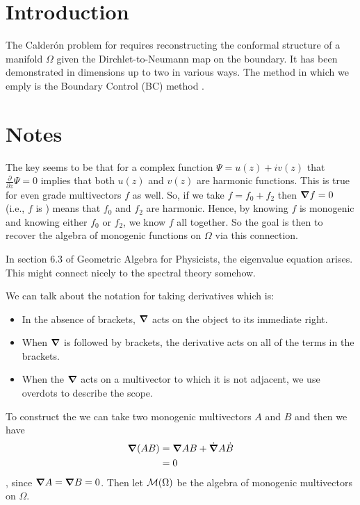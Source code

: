 \section{Introduction}
The Calder\'on problem for requires reconstructing the conformal structure of a manifold $\Omega$ given the Dirchlet-to-Neumann map on the boundary.  It has been demonstrated in dimensions up to two in various ways. The method in which we emply is the Boundary Control (BC) method \cite{belishev_complex}.  

\section{Notes}
The key seems to be that for a complex function $\Psi=u(z)+iv(z)$ that $\frac{\partial}{\partial z} \Psi =0$ implies that both $u(z)$ and $v(z)$ are harmonic functions. This is true for even grade multivectors $f$ as well. So, if we take $f=f_0+f_2$ then $\boldsymbol{\nabla} f =0$ (i.e., $f$ is ) means that $f_0$ and $f_2$ are harmonic.  Hence, by knowing $f$ is monogenic and knowing either $f_0$ or $f_2$, we know $f$ all together.  So the goal is then to recover the algebra of monogenic functions on $\Omega$ via this connection.

In section 6.3 of Geometric Algebra for Physicists, the eigenvalue equation arises. This might connect nicely to the spectral theory somehow.

We can talk about the notation for taking derivatives which is:
\begin{itemize}
    \item In the absence of brackets, $\boldsymbol{\nabla}$ acts on the object to its immediate right.
    \item When $\boldsymbol{\nabla}$ is followed by brackets, the derivative acts on all of the terms in the brackets.
    \item When the $\boldsymbol{\nabla}$ acts on a multivector to which it is not adjacent, we use overdots to describe the scope.
\end{itemize}
To construct the  we can take two monogenic multivectors $A$ and $B$ and then we have
\begin{align*}
\boldsymbol{\nabla} (AB) &= \boldsymbol{\nabla} AB + \dot{\boldsymbol{\nabla}}A\dot{B}\\
&= 0
\end{align*},
since $\boldsymbol{\nabla} A=\boldsymbol{\nabla} B=0$. Then let $\mathcal{M}(\Omega)$ be the algebra of monogenic multivectors on $\Omega$.

